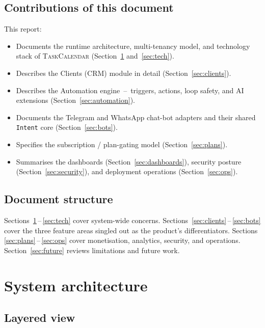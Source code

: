 \documentclass[11pt,a4paper,oneside]{article}
\newcommand{\tc}{\textsc{TaskCalendar}}
\newcommand{\code}[1]{\texttt{\small #1}}
\newcommand{\dash}{\,--\,}
\begin{document}
\subsection{Contributions of this document}

This report:

\begin{itemize}
  \item Documents the runtime architecture, multi-tenancy model, and
    technology stack of \tc{} (Section~\ref{sec:arch} and~\ref{sec:tech}).
  \item Describes the Clients (CRM) module in detail
    (Section~\ref{sec:clients}).
  \item Describes the Automation engine \dash{} triggers, actions, loop
    safety, and AI extensions (Section~\ref{sec:automation}).
  \item Documents the Telegram and WhatsApp chat-bot adapters and
    their shared \code{Intent} core (Section~\ref{sec:bots}).
  \item Specifies the subscription / plan-gating model
    (Section~\ref{sec:plans}).
  \item Summarises the dashboards (Section~\ref{sec:dashboards}),
    security posture (Section~\ref{sec:security}), and deployment
    operations (Section~\ref{sec:ops}).
\end{itemize}

\subsection{Document structure}

Sections~\ref{sec:arch}\dash\ref{sec:tech} cover system-wide concerns.
Sections~\ref{sec:clients}\dash\ref{sec:bots} cover the three feature
areas singled out as the product's differentiators. Sections
\ref{sec:plans}\dash\ref{sec:ops} cover monetisation, analytics,
security, and operations. Section~\ref{sec:future} reviews limitations
and future work.

\section{System architecture}\label{sec:arch}

\subsection{Layered view}
\end{document}
